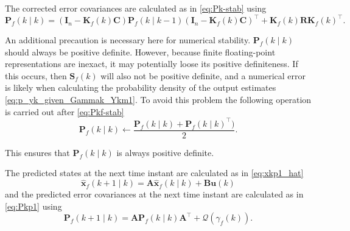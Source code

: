 {The corrected error covariances are calculated as in \eqref{eq:Pk-stab} using 
%
%
\begin{equation} \label{eq:Pkf-stab}
	\mathbf{P}_f(k \mid k) = \left( \mathbf{I}_n - \mathbf{K}_f(k) \mathbf{C} \right ) \mathbf{P}_f(k \mid k-1) \left( \mathbf{I}_n - \mathbf{K}_f(k) \mathbf{C} \right )^\intercal + \mathbf{K}_f(k) \mathbf{R} \mathbf{K}_f(k)^\intercal.
\end{equation}

An additional precaution is necessary here for numerical stability. $\mathbf{P}_f(k \mid k)$ should always be positive definite. However, because finite floating-point representations are inexact, it may potentially loose its positive definiteness. If this occurs, then $\mathbf{S}_f(k)$ will also not be positive definite, and a numerical error is likely when calculating the probability density of the output estimates \eqref{eq:p_yk_given_Gammak_Ykm1}. To avoid this problem the following operation is carried out after \eqref{eq:Pkf-stab}
\begin{equation} \label{eq:Pkf-psd-fix}
	\mathbf{P}_f(k \mid k) \gets \frac{ \mathbf{P}_f(k \mid k) + \mathbf{P}_f(k \mid k)^\intercal )}{2}. 
\end{equation}

This ensures that $\mathbf{P}_f(k \mid k)$ is always positive definite.

The predicted states at the next time instant are calculated as in \eqref{eq:xkp1_hat}
\begin{equation} \label{eq:xfkp1_hat}
	\mathbf{\hat{x}}_f(k+1 \mid k) = \mathbf{A} \mathbf{\hat{x}}_f(k \mid k) + \mathbf{B} \mathbf{u}(k)
\end{equation}
and the predicted error covariances at the next time instant are calculated as in \eqref{eq:Pkp1} using
%
\begin{equation} \label{eq:Pfkp1}
	\mathbf{P}_f(k+1 \mid k) = \mathbf{A} \mathbf{P}_f(k \mid k)  \mathbf{A}^\intercal  + \mathcal{Q}(\gamma_f(k)).
\end{equation}

}
